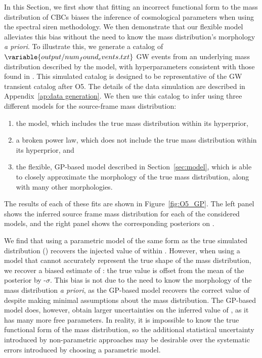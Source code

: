 \documentclass[]{aastex631}
\begin{document}
In this Section, we first show that fitting an incorrect functional form to the mass distribution of \acp{CBC} biases the inference of cosmological parameters when using the spectral siren methodology.
We then demonstrate that our flexible model alleviates this bias without the need to know the mass distribution's morphology \emph{a priori}.
To illustrate this, we generate a catalog of $\variable{output/num_found_events.txt}$ \ac{GW} events from an underlying mass distribution described by the \plp{} model, with hyperparameters consistent with those found in \citet{o3b_pop}.
This simulated catalog is designed to be representative of the \ac{GW}  transient catalog after \ac{O5}.
The details of the data simulation are described in Appendix~\ref{ap:data generation}.
We then use this catalog to infer \Ho{} using three different models for the source-frame mass distribution:
\begin{enumerate}
    \item the \plp{} model, which includes the true mass distribution within its hyperprior,
    \item a broken power law, which does not include the true mass distribution within its hyperprior, and 
    \item the flexible, \ac{GP}-based model described in Section~\ref{sec:model}, which is able to closely approximate the morphology of the true mass distribution, along with many other morphologies.
\end{enumerate}
The results of each of these fits are shown in Figure~\ref{fig:O5_GP}. 
The left panel shows the inferred source frame mass distribution for each of the considered models, and the right panel shows the corresponding posteriors on \Ho{}.

We find that using a parametric model of the same form as the true simulated distribution (\plp) recovers the injected value of \Ho{} within .
However, when using a model that cannot accurately represent the true shape of the mass distribution, we recover a biased estimate of \Ho: the true value is offset from the mean of the posterior by -$\sigma$.
This bias is not due to the need to know the morphology of the mass distribution \emph{a priori}, as the \ac{GP}-based model recovers the correct value of \Ho{} despite making minimal assumptions about the mass distribution.
The \ac{GP}-based model does, however, obtain larger uncertainties on the inferred value of \Ho, as it has many more free parameters. 
In reality, it is impossible to know the true functional form of the mass distribution, so the additional statistical uncertainty introduced by non-parametric approaches may be desirable over the systematic errors introduced by choosing a parametric model.
\end{document}
